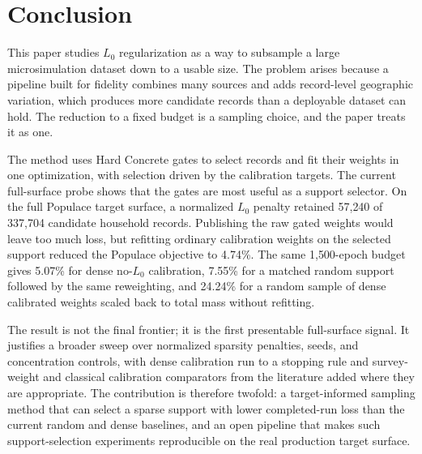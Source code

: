 \section{Conclusion}
\label{sec:conclusion}

This paper studies $L_0$ regularization as a way to subsample a large microsimulation dataset down to
a usable size. The problem arises because a pipeline built for fidelity combines many sources and
adds record-level geographic variation, which produces more candidate records than a deployable dataset
can hold. The reduction to a fixed budget is a sampling choice, and the paper treats it as one.

The method uses Hard Concrete gates to select records and fit their weights in one optimization, with
selection driven by the calibration targets. The current full-surface probe shows that the gates are most
useful as a support selector. On the full Populace target surface, a normalized $L_0$ penalty retained
57{,}240 of 337{,}704 candidate household records. Publishing the raw gated weights would leave too much
loss, but refitting ordinary calibration weights on the selected support reduced the Populace objective to
4.74\%. The same 1{,}500-epoch budget gives 5.07\% for dense no-$L_0$ calibration, 7.55\% for a matched
random support followed by the same reweighting, and 24.24\% for a random sample of dense calibrated
weights scaled back to total mass without refitting.

The result is not the final frontier; it is the first presentable full-surface signal. It justifies a
broader sweep over normalized sparsity penalties, seeds, and concentration controls, with dense
calibration run to a stopping rule and survey-weight and classical calibration comparators from the
literature added where they are appropriate. The contribution is therefore twofold: a target-informed sampling method
that can select a sparse support with lower completed-run loss than the current random and dense baselines,
and an open \populace{} pipeline that makes such support-selection experiments reproducible on the real
production target surface.
